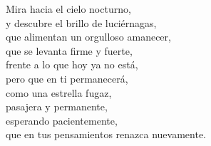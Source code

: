 \begin{center}
\vspace{1em}
Mira hacia el cielo nocturno,\\
y descubre el brillo de luciérnagas,\\
que alimentan un orgulloso amanecer,\\
que se levanta firme y fuerte,\\
frente a lo que hoy ya no está,\\
pero que en ti permanecerá,\\
como una estrella fugaz,\\
pasajera y permanente,\\
esperando pacientemente,\\
que en tus pensamientos renazca nuevamente.



\end{center}




